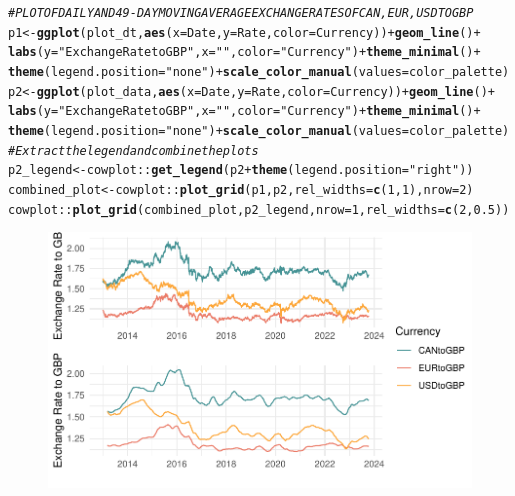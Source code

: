 \documentclass{article}\usepackage[]{graphicx}\usepackage[]{xcolor}
\makeatletter
\def\maxwidth{ %
  \ifdim\Gin@nat@width>\linewidth
    \linewidth
  \else
    \Gin@nat@width
  \fi
}
\newcommand{\hlnum}[1]{\textcolor[rgb]{0.686,0.059,0.569}{#1}}%
\newcommand{\hlstr}[1]{\textcolor[rgb]{0.192,0.494,0.8}{#1}}%
\newcommand{\hlcom}[1]{\textcolor[rgb]{0.678,0.584,0.686}{\textit{#1}}}%
\newcommand{\hlopt}[1]{\textcolor[rgb]{0,0,0}{#1}}%
\newcommand{\hlstd}[1]{\textcolor[rgb]{0.345,0.345,0.345}{#1}}%
\newcommand{\hlkwb}[1]{\textcolor[rgb]{0.69,0.353,0.396}{#1}}%
\newcommand{\hlkwc}[1]{\textcolor[rgb]{0.333,0.667,0.333}{#1}}%
\newcommand{\hlkwd}[1]{\textcolor[rgb]{0.737,0.353,0.396}{\textbf{#1}}}%
\newenvironment{kframe}{%
 \def\at@end@of@kframe{}%
 \ifinner\ifhmode%
  \def\at@end@of@kframe{\end{minipage}}%
  \begin{minipage}{\columnwidth}%
 \fi\fi%
 \def\FrameCommand##1{\hskip\@totalleftmargin \hskip-\fboxsep
 \colorbox{shadecolor}{##1}\hskip-\fboxsep
     \hskip-\linewidth \hskip-\@totalleftmargin \hskip\columnwidth}%
 \MakeFramed {\advance\hsize-\width
   \@totalleftmargin\z@ \linewidth\hsize
   \@setminipage}}%
 {\par\unskip\endMakeFramed%
 \at@end@of@kframe}
\newenvironment{knitrout}{}{} %
\numberwithin{equation}{section}
\makeatother
\begin{document}
\begin{knitrout}\scriptsize
{}\color{fgcolor}\begin{kframe}
\begin{alltt}
\hlcom{# PLOT OF DAILY AND 49-DAY MOVING AVERAGE EXCHANGE RATES OF CAN, EUR, USD TO GBP}
\hlstd{p1} \hlkwb{<-} \hlkwd{ggplot}\hlstd{(plot_dt,} \hlkwd{aes}\hlstd{(}\hlkwc{x} \hlstd{= Date,} \hlkwc{y} \hlstd{= Rate,} \hlkwc{color} \hlstd{= Currency))} \hlopt{+} \hlkwd{geom_line}\hlstd{()} \hlopt{+}
  \hlkwd{labs}\hlstd{(}\hlkwc{y} \hlstd{=} \hlstr{"Exchange Rate to GBP"}\hlstd{,} \hlkwc{x} \hlstd{=} \hlstr{""}\hlstd{,} \hlkwc{color} \hlstd{=} \hlstr{"Currency"}\hlstd{)} \hlopt{+} \hlkwd{theme_minimal}\hlstd{()} \hlopt{+}
  \hlkwd{theme}\hlstd{(}\hlkwc{legend.position} \hlstd{=} \hlstr{"none"}\hlstd{)} \hlopt{+} \hlkwd{scale_color_manual}\hlstd{(}\hlkwc{values} \hlstd{= color_palette)}
\hlstd{p2} \hlkwb{<-} \hlkwd{ggplot}\hlstd{(plot_data,} \hlkwd{aes}\hlstd{(}\hlkwc{x} \hlstd{= Date,} \hlkwc{y} \hlstd{= Rate,} \hlkwc{color} \hlstd{= Currency))} \hlopt{+} \hlkwd{geom_line}\hlstd{()} \hlopt{+}
  \hlkwd{labs}\hlstd{(}\hlkwc{y} \hlstd{=} \hlstr{"Exchange Rate to GBP"}\hlstd{,} \hlkwc{x} \hlstd{=} \hlstr{""}\hlstd{,} \hlkwc{color} \hlstd{=} \hlstr{"Currency"}\hlstd{)} \hlopt{+} \hlkwd{theme_minimal}\hlstd{()} \hlopt{+}
  \hlkwd{theme}\hlstd{(}\hlkwc{legend.position} \hlstd{=} \hlstr{"none"}\hlstd{)} \hlopt{+} \hlkwd{scale_color_manual}\hlstd{(}\hlkwc{values} \hlstd{= color_palette)}
\hlcom{# Extract the legend and combine the plots }
\hlstd{p2_legend} \hlkwb{<-} \hlstd{cowplot}\hlopt{::}\hlkwd{get_legend}\hlstd{(p2} \hlopt{+} \hlkwd{theme}\hlstd{(}\hlkwc{legend.position} \hlstd{=} \hlstr{"right"}\hlstd{))}
\hlstd{combined_plot} \hlkwb{<-} \hlstd{cowplot}\hlopt{::}\hlkwd{plot_grid}\hlstd{(p1, p2,} \hlkwc{rel_widths} \hlstd{=} \hlkwd{c}\hlstd{(}\hlnum{1}\hlstd{,} \hlnum{1}\hlstd{),} \hlkwc{nrow} \hlstd{=} \hlnum{2}\hlstd{)}
\hlstd{cowplot}\hlopt{::}\hlkwd{plot_grid}\hlstd{(combined_plot, p2_legend,} \hlkwc{nrow} \hlstd{=} \hlnum{1}\hlstd{,} \hlkwc{rel_widths} \hlstd{=} \hlkwd{c}\hlstd{(}\hlnum{2}\hlstd{,} \hlnum{0.5}\hlstd{))}
\end{alltt}
\end{kframe}\begin{figure}[H]

{\centering \includegraphics[width=\maxwidth]{figure/beamer-all_exchange_rates-1} 

}
\end{figure}
\end{knitrout}
\end{document}
